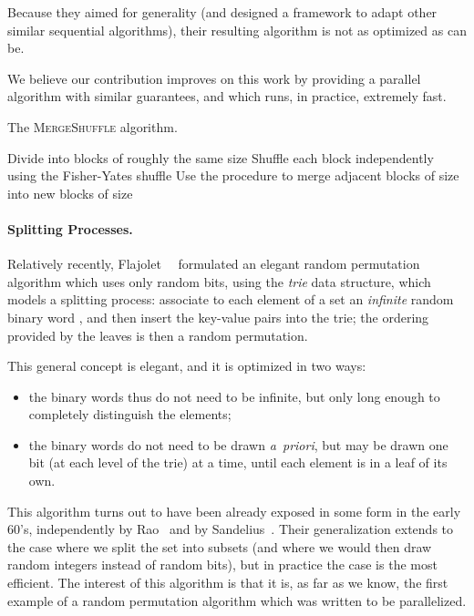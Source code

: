 \documentclass[letter,11pt,en]{quick-document}
\begin{document}
Because they aimed for generality (and designed a framework to adapt other
similar sequential algorithms), their resulting algorithm is not as
optimized as can be.

We believe our contribution improves on this work by providing a parallel
algorithm with similar guarantees, and which runs, in practice, extremely
fast.


\begin{algorithm}
\caption{The \textsc{MergeShuffle}{} algorithm.\label{alg-mergeshuffle}}
\begin{algorithmic}[1]
\State Divide  into  blocks of roughly the same size
\State Shuffle each block independently using the Fisher-Yates shuffle
\State 
\Repeat
  \State Use the  procedure to merge adjacent blocks of size
   into new blocks of size 
  \State 
{}
\EndProcedure
\end{algorithmic}
\end{algorithm}


\paragraph{Splitting Processes.} Relatively recently,
Flajolet~\etal~\cite{FlPeSo11} formulated an elegant random permutation
algorithm which uses only random bits, using the \emph{trie} data
structure, which models a splitting process: associate to each element of
a set  an \emph{infinite} random binary word , and
then insert the key-value pairs  into the trie; the
ordering provided by the leaves is then a random permutation.

This general concept is elegant, and it is optimized in two ways:
\begin{itemize}[noitemsep]
\item the binary words thus do not need to be infinite, but only long
  enough to completely distinguish the elements;
\item the binary words do not need to be drawn \emph{a~priori}, but may be
  drawn one bit (at each level of the trie) at a time, until each element
  is in a leaf of its own.
\end{itemize}
This algorithm turns out to have been already exposed in some form in the
early 60's, independently by Rao~\cite{Rao61} and by
Sandelius~\cite{Sandelius62}. Their generalization extends to the case
where we split the set into  subsets (and where we would then draw
random integers instead of random bits), but in practice the case  is
the most efficient. The interest of this algorithm is that it is, as far
as we know, the first example of a random permutation algorithm which was
written to be parallelized.
\end{document}
